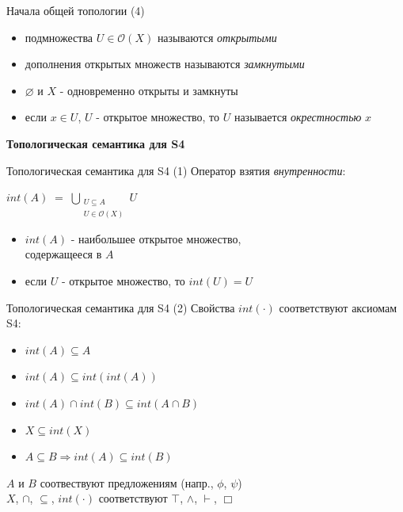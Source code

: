 \documentclass{beamer}
\begin{document}
\begin{frame}{Начала общей топологии (4)}
\begin{itemize}
	\item подмножества $U \in \mathcal{O}(X)$ называются \textit{открытыми}
	\item дополнения открытых множеств называются \textit{замкнутыми}
	\item $\varnothing$ и $X$ - одновременно открыты и замкнуты
	\item если $x \in U$, $U$ - открытое множество, то $U$ называется \textit{окрестностью} $x$
\end{itemize}
\end{frame}

\begin{frame}{}
\begin{center}
	\textbf{Топологическая семантика для S4}
\end{center}
\end{frame}

\begin{frame}{Топологическая семантика для S4 (1)}
Оператор взятия \textit{внутренности}:\\
\bigskip
\begin{center}
	    $\displaystyle int(A) \; = \; \bigcup_{\substack{U \subseteq A\\U \in \mathcal{O}(X)}}{U}$
\end{center}
\bigskip
\begin{itemize}
	\item $int(A)$ - наибольшее открытое множество, \\содержащееся в $A$
	\item если $U$ - открытое множество, то $int(U) = U$
\end{itemize}
\end{frame}

\begin{frame}{Топологическая семантика для S4 (2)}
Свойства $int(\cdot)$ соответствуют аксиомам S4:\\
\bigskip
\begin{itemize}
	\item $int(A) \subseteq A$
	\item $int(A) \subseteq int(int(A))$
	\item $int(A) \cap int(B) \subseteq int(A \cap B)$
	\item $X \subseteq int(X)$
	\item $A \subseteq B \Longrightarrow int(A) \subseteq int(B)$
\end{itemize}
\bigskip
\begin{footnotesize}
$A$ и $B$ соотвествуют предложениям (напр., $\phi$, $\psi$)\\
$X$, $\cap$, $\subseteq$, $int(\cdot)$ соответствуют $\top$, $\wedge$, $\vdash$, $\Box$
\end{footnotesize}
\end{frame}
\end{document}

